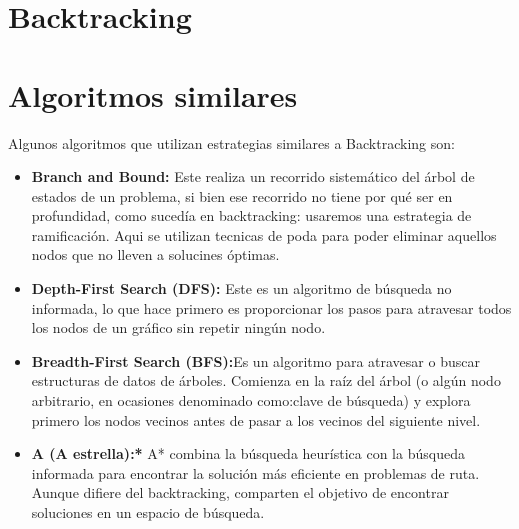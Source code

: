 \documentclass[a4paper,12pt]{article}
\begin{document}


\newpage
\section{Backtracking}





\section{Algoritmos similares}
Algunos algoritmos que utilizan estrategias similares a Backtracking son:

\begin{itemize}
    \item \textbf{Branch and Bound:} Este realiza un recorrido sistemático del árbol de estados de un problema, si bien ese recorrido no tiene por qué ser en profundidad, como sucedía en backtracking: usaremos una estrategia de ramificación. Aqui se utilizan tecnicas de poda para poder eliminar aquellos nodos que no lleven a solucines óptimas.
    
    \item \textbf{Depth-First Search (DFS):} Este es un algoritmo de búsqueda no informada, lo que hace primero es proporcionar los pasos para atravesar todos los nodos de un gráfico sin repetir ningún nodo.
    
    \item \textbf{Breadth-First Search (BFS):}Es un algoritmo para atravesar o buscar estructuras de datos de árboles. Comienza en la raíz del árbol (o algún nodo arbitrario, en ocasiones denominado como:clave de búsqueda) y explora primero los nodos vecinos antes de pasar a los vecinos del siguiente nivel.
    
    \item \textbf{A (A estrella):*} A* combina la búsqueda heurística con la búsqueda informada para encontrar la solución más eficiente en problemas de ruta. Aunque difiere del backtracking, comparten el objetivo de encontrar soluciones en un espacio de búsqueda.
\end{itemize}
\end{document}
